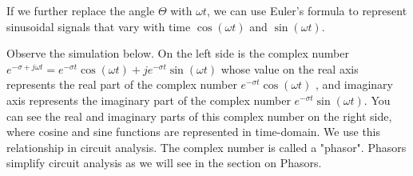 \documentclass{ximera}
\begin{document}
If we further replace the angle $\Theta$ with $\omega t$, we can use Euler's formula to represent sinusoidal signals that vary with time $\cos(\omega t)$ and $\sin (\omega t)$. 


Observe the simulation below. On the left side is the complex number $e^{-\sigma +j \omega t} = e^{-\sigma t} \cos(\omega t) + j e^{-\sigma t} \sin (\omega t)$ whose value on the real axis represents the real part of the complex number $e^{-\sigma t} \cos(\omega t)$ , and imaginary axis represents the imaginary part of the complex number $e^{-\sigma t} \sin (\omega t)$. You can see the real and imaginary parts of this complex number on the right side, where cosine and sine functions are represented in time-domain. We use this relationship in circuit analysis. The complex number is called a "phasor". Phasors simplify circuit analysis as we will see in the section on Phasors.

  
 \begin{center}  
\end{center} 
\end{document}
